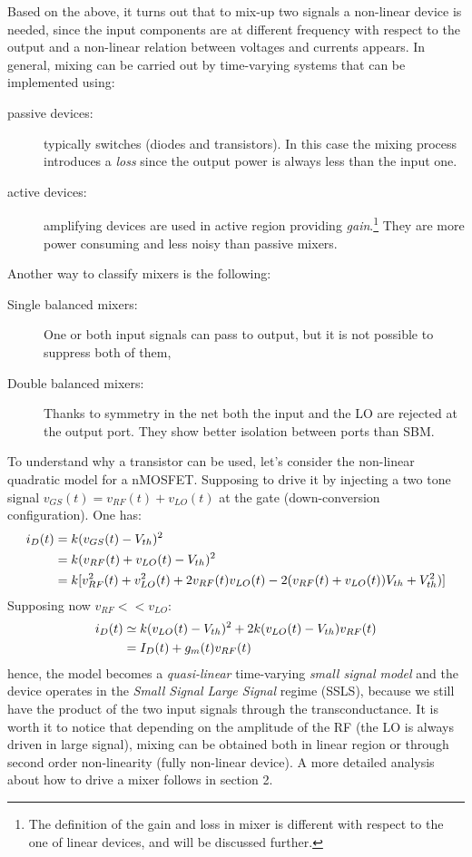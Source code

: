 Based on the above, it turns out that to mix-up two signals a non-linear device is needed, since the input components are at different frequency with respect to the output and a non-linear relation between voltages and currents appears. In general, mixing can be carried out by time-varying systems that can be implemented using:
\begin{description}
	\item [passive devices:]	typically switches (diodes and transistors). In this case the mixing process introduces a \emph{loss} since the output power is always less than the input one.
	\item [active devices:] amplifying devices are used in active region providing \emph{gain}.\footnote{The definition of the gain and loss in mixer is different with respect to the one of linear devices, and will be discussed further.} They are more power consuming and less noisy than passive mixers.
\end{description}
Another way to classify mixers is the following:
\begin{description}
	\item [Single balanced mixers:] One or both input signals can pass to output, but it is not possible to suppress both of them,
	\item [Double balanced mixers:] Thanks to symmetry in the net both the input and the LO are rejected at the output port. They show better isolation between ports than SBM. 
\end{description}
To understand why a transistor can be used, let's consider the non-linear quadratic model for a nMOSFET. Supposing to drive it by injecting a two tone signal $v_{GS}(t)=v_{RF}(t)+v_{LO}(t)$ at the gate (down-conversion configuration). One has:
\begin{align}
i_D(t) &= k(v_{GS}(t)-V_{th})^2 \notag \\
& = k(v_{RF}(t)+v_{LO}(t)-V_{th})^2 \notag \\
& = k[v_{RF}^2(t)+v_{LO}^2(t)+2v_{RF}(t)v_{LO}(t)-2(v_{RF}(t)+v_{LO}(t))V_{th}+V_{th}^2)] \notag
\end{align}
Supposing now $v_{RF}<<v_{LO}$:
\begin{align}
i_D(t) &\simeq k(v_{LO}(t)-V_{th})^2+2k(v_{LO}(t)-V_{th})v_{RF}(t) \notag  \\
& = I_D(t)+g_m(t)v_{RF}(t) \notag
\end{align}
hence, the model becomes a \emph{quasi-linear} time-varying \emph{small signal model} and the device operates in the \emph{Small Signal Large Signal} regime (SSLS), because we still have the product of the two input signals through the transconductance. It is worth it to notice that depending on the amplitude of the RF (the LO is always driven in large signal), mixing can be obtained both in linear region or through second order non-linearity (fully non-linear device).
A more detailed analysis about how to drive a mixer follows in section 2.

